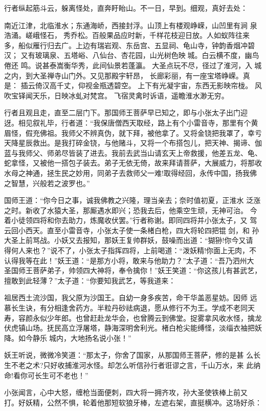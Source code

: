 行者纵起筋斗云，躲离怪处，直奔盱眙山。不一日，早到。细观，真好去处：

南近江津，北临淮水；东通海峤，西接封浮。山顶上有楼观峥嵘，山凹里有涧
泉浩涌。嵯峨怪石，秀乔松。百般果品应时新，千样花枝迎日放。人如蚁阵往来
多，船似雁行归去广。上边有瑞岩观、东岳宫、五显祠、龟山寺，钟韵香烟冲碧汉；
又有玻璃泉、五塔峪、八仙台、杏花园，山光树色映城。白云横不度，幽鸟倦还
鸣。说甚泰嵩衡华秀，此间仙景若蓬瀛。
大圣点玩不尽，径过了淮河，入城之内，到大圣禅寺山门外。又见那殿宇轩昂，
长廊彩丽，有一座宝塔峥嵘。真是：
插云倚汉高千丈，仰视金瓶透碧空。
上下有光凝宇宙，东西无影映帘栊。
风吹宝铎闻天乐，日映冰虬对梵宫。
飞宿灵禽时诉语，遥瞻淮水渺无穷。

行者且观且走，直至二层门下。那国师王菩萨早已知之，即与小张太子出门迎
迓。相见叙礼毕，行者道：“我保唐僧西天取经，路上有个小雷音寺，那里有个黄
眉怪，假充佛祖。我师父不辨真伪，就下拜，被他拿了。又将金铙把我罩了，幸亏
天降星辰救出。是我打碎金铙，与他赌斗，又将一个布搭包儿，把天神、揭谛、伽
蓝与我师父、师弟尽皆装了进去。我前去武当山请玄天上帝救援，他差五龙、龟、
蛇拿怪，又被他一搭包子装去。弟子无依无倚，故来拜请菩萨，大展威力，将那收
水母之神通，拯生民之妙用，同弟子去救师父一难!取得经回，永传中国，扬我佛
之智慧，兴般若之波罗也。”

国师王道：“你今日之事，诚我佛教之兴隆，理当亲去；奈时值初夏，正淮水
泛涨之时。新收了水猿大圣，那厮遇水即兴；恐我去后，他乘空生顽，无神可治。
今着小徒领四将和你去助力，炼魔收伏罢。”行者称谢。即同四将并小张太子，又
驾云回小西天。直至小雷音寺，小张太子使一条楮白枪，四大将轮四把锟剑，和
孙大圣上前骂战。小妖又去报知，那妖王复帅群妖，鼓噪而出道：“猢狲!你今又请
得何人来也？”说不了，小张太子指挥四将，上前喝道：“泼妖精!你面上无肉，不
认得我等在此！”妖王道：“是那方小将，敢来与他助力？”太子道：“吾乃泗州大
圣国师王菩萨弟子，帅领四大神将，奉令擒你！”妖王笑道：“你这孩儿有甚武艺，
擅敢到此轻薄？”太子道：“你要知我武艺，等我道来：

祖居西土流沙国，我父原为沙国王。自幼一身多疾苦，命干华盖恶星妨。因师
远慕长生诀，有分相逢舍药方。半粒丹砂祛病退，愿从修行不为王。学成不老同天
寿，容颜永似少年郎。也曾赶赴龙华会，也曾腾云到佛堂。捉雾拿风收水怪，擒龙
伏虎镇山场。抚民高立浮屠塔，静海深明舍利光。楮白枪尖能缚怪，淡缁衣袖把妖
降。如今静乐城内，大地扬名说小张！”

妖王听说，微微冷笑道：“那太子，你舍了国家，从那国师王菩萨，修的是甚
么长生不老之术?只好收捕淮河水怪。却怎么听信孙行者诳谬之言，千山万水，来
此纳命!看你可长生可不老也！”

小张闻言，心中大怒，缠枪当面便刺，四大将一拥齐攻，孙大圣使铁棒上前又
打。好妖精，公然不惧，轮着他那短软狼牙棒，左遮右架，直挺横冲。这场好杀：

